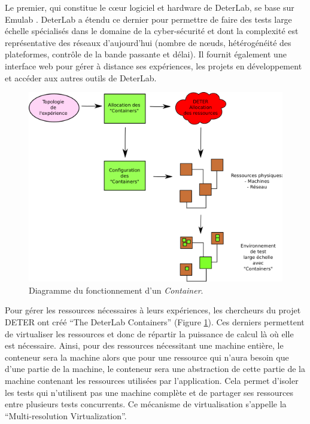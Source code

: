 Le premier, qui constitue le c\oe ur logiciel et hardware de DeterLab, se base
sur Emulab \citep{EMULAB_INIT}. DeterLab a étendu ce dernier pour permettre de
faire des tests large échelle spécialisés dans le domaine de la cyber-sécurité
et dont la complexité est représentative des réseaux d'aujourd'hui (nombre de
n\oe uds, hétérogénéité des plateformes, contrôle de la bande passante et
délai). Il fournit également une interface web pour gérer à distance ses
expériences, les projets en développement et accéder aux autres outils de
DeterLab.

\begin{figure}
  \centering \includegraphics[scale=0.75]{Pictures/png/Deter_fonctionnement_container_v2}
  \caption{Diagramme du fonctionnement d'un \textit{Container}.}
  \label{Conteneur}
\end{figure}

Pour gérer les ressources nécessaires à leurs expériences, les
chercheurs du projet DETER ont créé ``The DeterLab Containers''
(Figure \ref{Conteneur}). Ces derniers permettent de virtualiser les
ressources et donc de répartir la puissance de calcul là où elle est
nécessaire. Ainsi, pour des ressources nécessitant une machine entière,
le conteneur sera la machine alors que pour une ressource qui n'aura
besoin que d'une partie de la machine, le conteneur sera une
abstraction de cette partie de la machine contenant les ressources
utilisées par l'application. Cela permet d'isoler les tests qui
n'utilisent pas une machine complète et de partager ses ressources
entre plusieurs tests concurrents. Ce mécanisme de virtualisation
s'appelle la ``Multi-resolution Virtualization''.

